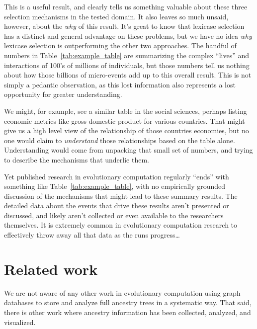 This is a useful result, and clearly tells us something valuable about
these three selection mechanisms in the tested domain. It also leaves
so much unsaid, however, about the \emph{why} of this result. It's great
to know that lexicase selection has a distinct and general advantage on 
these problems, but we have no idea \emph{why} lexicase selection is
outperforming the other two approaches. The handful of numbers in
Table~\ref{tab:example_table} are summarizing the complex ``lives'' 
and interactions of 100's of millions of individuals, but those numbers
tell us nothing about how those billions of micro-events add up to this
overall result. This is not simply a pedantic observation, as this lost 
information also represents a lost opportunity for greater understanding. 

We might, for example, see a similar table in the social sciences, 
perhaps listing economic metrics like gross domestic product for 
various countries. That might give us a high level view of the relationship
of those countries economies, but no one would claim to \emph{understand}
those relationships based on the table alone. Understanding would come
from unpacking that small set of numbers, and trying to describe the
mechanisms that underlie them. 

Yet published research in evolutionary
computation regularly ``ends'' with something like 
Table~\ref{tab:example_table}, with no empirically grounded discussion 
of the mechanisms that might lead to these summary results. The detailed
data about the events that drive these results aren't presented or discussed,
and likely aren't collected or even available to the researchers themselves.
It is extremely common in evolutionary computation research to effectively
throw away all that data as the runs progress\ldots
{}


\section{Related work}
\label{sec:related}

We are not aware of any other work in evolutionary computation using graph
databases to store and analyze full ancestry trees in a systematic way. That
said, there is other work where ancestry information has been collected,
analyzed, and visualized.


